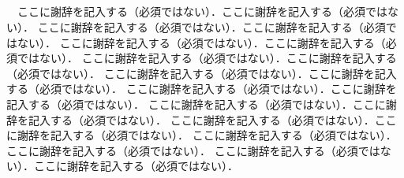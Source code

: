 \begin{center}
\section*{}                      %
\vspace*{-2zh}
\end{center}

　ここに謝辞を記入する（必須ではない）．ここに謝辞を記入する（必須ではない）．
ここに謝辞を記入する（必須ではない）．ここに謝辞を記入する（必須ではない）．
ここに謝辞を記入する（必須ではない）．ここに謝辞を記入する（必須ではない）．
ここに謝辞を記入する（必須ではない）．ここに謝辞を記入する（必須ではない）．
ここに謝辞を記入する（必須ではない）．ここに謝辞を記入する（必須ではない）．
ここに謝辞を記入する（必須ではない）．ここに謝辞を記入する（必須ではない）．
ここに謝辞を記入する（必須ではない）．ここに謝辞を記入する（必須ではない）．
ここに謝辞を記入する（必須ではない）．ここに謝辞を記入する（必須ではない）．
ここに謝辞を記入する（必須ではない）．ここに謝辞を記入する（必須ではない）．
ここに謝辞を記入する（必須ではない）．ここに謝辞を記入する（必須ではない）．

